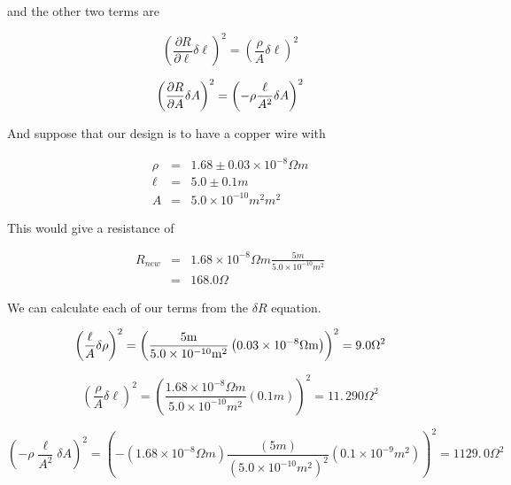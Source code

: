 \noindent and the other two terms are 

\begin{equation*}
	\left( \frac{\partial R}{\partial \ell }\delta \ell \right) ^{2}=\left( 
	\frac{\rho }{A}\delta \ell \right) ^{2}
\end{equation*}

\begin{equation*}
	\left( \frac{\partial R}{\partial A}\delta A\right) ^{2}=\left( -\rho \frac{%
		\ell }{A^{2}}\delta A\right) ^{2}
\end{equation*}

And suppose that our design is to have a copper wire with 

\begin{eqnarray*}
	\rho &=&1.68\pm 0.03\times 10^{-8}\unit{\Omega}\unit{m} \\
	\ell &=&5.0\pm 0.1\unit{m} \\
	A &=&5.0\times 10^{-10}\unit{m}^{2}\unit{m}^{2}
\end{eqnarray*}

\noindent This would give a resistance of 

\begin{eqnarray*}
	R_{new} &=&1.68\times 10^{-8}\unit{\Omega}\unit{m}\frac{5\unit{m}}{5.0\times 10^{-10}\unit{m}^{2}} \\
	&=&168.0\unit{\Omega}
\end{eqnarray*}

We can calculate each of our terms from the $\delta R$ equation. 

\begin{equation*}
	\left( \frac{\ell }{A}\delta \rho \right) ^{2}=\left( \frac{5\unit{m}}{%
		5.0\times 10^{-10}\unit{m}^{2}}\left( 0.03\times 10^{-8}\unit{\Omega	}\unit{m}\right) \right) ^{2}=9.0\unit{\Omega}^{2}
\end{equation*}

\begin{equation*}
	\left( \frac{\rho }{A}\delta \ell \right) ^{2}=\left( \frac{1.68\times
		10^{-8}\unit{\Omega}\unit{m}}{5.0\times 10^{-10}\unit{m}^{2}}\left( 0.1\unit{m}\right) \right) 	^{2}=11.\,\allowbreak 290\unit{\Omega}^{2}
\end{equation*}

\begin{equation*}
	\left( -\rho \frac{\ell }{A^{2}}\delta A\right) ^{2}=\left( -\left(
	1.68\times 10^{-8}\unit{\Omega}\unit{m}\right) \frac{\left( 5\unit{m}\right) }{\left( 5.0\times 10^{-10} \unit{m}^{2}\right) ^{2}}\left( 0.1\times 10^{-9}\unit{m}^{2}\right) \right)
	^{2}=1129.\,\allowbreak 0\unit{\Omega}^{2}
\end{equation*}

